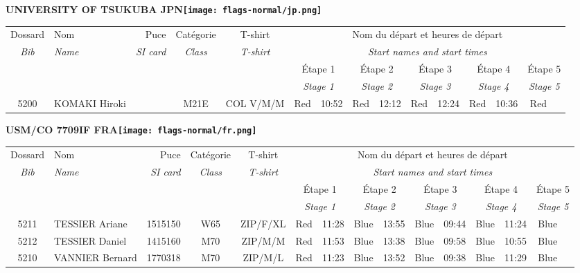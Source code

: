 \documentclass{report}
\begin{document}
\newpage
  \Huge \centering \bfseries UNIVERSITY OF TSUKUBA  JPN\normalfont \footnotesize \sffamily \hfill \texttt{[image: flags-normal/jp.png]} \newline 
  \begin{longtable}{|c|l|r|c|c|*{5}{cc|}}
    Dossard & Nom  & Puce    & Catégorie & T-shirt & \multicolumn{10}{c|}{Nom du départ et heures de départ} \\
    \itshape Bib     & \itshape Name & \itshape SI card & \itshape Class  & \itshape  T-shirt  & \multicolumn{10}{c|}{\itshape Start names and start times} \\
    \hline
    & & & & & \multicolumn{2}{c|}{Étape 1} & \multicolumn{2}{c|}{Étape 2} & \multicolumn{2}{c|}{Étape 3} & \multicolumn{2}{c|}{Étape 4} & \multicolumn{2}{c|}{Étape 5} \\
    & & & & & \multicolumn{2}{c|}{\itshape Stage 1} & \multicolumn{2}{c|}{\itshape Stage 2} & \multicolumn{2}{c|}{\itshape Stage 3} & \multicolumn{2}{c|}{\itshape Stage 4} & \multicolumn{2}{c|}{\itshape Stage 5} \\
    \hline
    5200 & KOMAKI Hiroki &  & M21E & COL V/M/M & Red & 10:52 & Red & 12:12 & Red & 12:24 & Red & 10:36 & Red &  \\
  \end{longtable}
\newpage
  \Huge \centering \bfseries USM/CO 7709IF FRA\normalfont \footnotesize \sffamily \hfill \texttt{[image: flags-normal/fr.png]} \newline 
  \begin{longtable}{|c|l|r|c|c|*{5}{cc|}}
    Dossard & Nom  & Puce    & Catégorie & T-shirt & \multicolumn{10}{c|}{Nom du départ et heures de départ} \\
    \itshape Bib     & \itshape Name & \itshape SI card & \itshape Class  & \itshape  T-shirt  & \multicolumn{10}{c|}{\itshape Start names and start times} \\
    \hline
    & & & & & \multicolumn{2}{c|}{Étape 1} & \multicolumn{2}{c|}{Étape 2} & \multicolumn{2}{c|}{Étape 3} & \multicolumn{2}{c|}{Étape 4} & \multicolumn{2}{c|}{Étape 5} \\
    & & & & & \multicolumn{2}{c|}{\itshape Stage 1} & \multicolumn{2}{c|}{\itshape Stage 2} & \multicolumn{2}{c|}{\itshape Stage 3} & \multicolumn{2}{c|}{\itshape Stage 4} & \multicolumn{2}{c|}{\itshape Stage 5} \\
    \hline
    5211 & TESSIER Ariane & 1515150 & W65 & ZIP/F/XL & Red & 11:28 & Blue & 13:55 & Blue & 09:44 & Blue & 11:24 & Blue &  \\
    5212 & TESSIER Daniel & 1415160 & M70 & ZIP/M/M & Red & 11:53 & Blue & 13:38 & Blue & 09:58 & Blue & 10:55 & Blue &  \\
    5210 & VANNIER Bernard & 1770318 & M70 & ZIP/M/L & Red & 11:23 & Blue & 13:52 & Blue & 09:38 & Blue & 11:29 & Blue &  \\
  \end{longtable}
\end{document}

